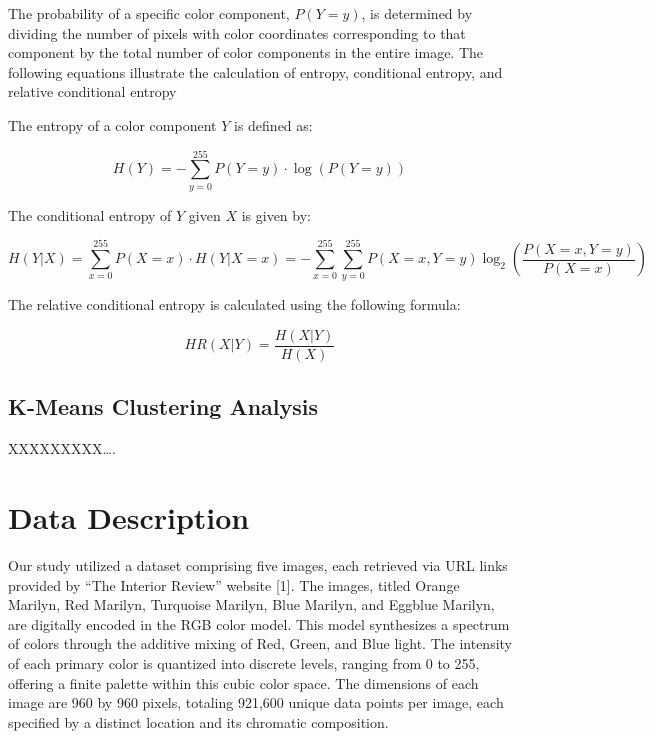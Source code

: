 \documentclass{article}
\begin{document}
The probability of a specific color component, \(P(Y=y)\), is determined
by dividing the number of pixels with color coordinates corresponding to
that component by the total number of color components in the entire
image. The following equations illustrate the calculation of entropy,
conditional entropy, and relative conditional entropy

The entropy of a color component \(Y\) is defined as:

\begin{equation}
    H(Y) = - \sum_{y=0}^{255} P(Y = y) \cdot \log(P(Y = y))
\end{equation}

The conditional entropy of \(Y\) given \(X\) is given by:

\begin{equation}
    H(Y|X) = \sum_{x=0}^{255} P(X = x) \cdot H(Y|X = x) = - \sum_{x=0}^{255} \sum_{y=0}^{255} P(X = x, Y = y) \log_2 \left(\frac{P(X = x, Y = y)}{P(X = x)}\right)
\end{equation}

The relative conditional entropy is calculated using the following
formula:

\begin{equation}
    HR(X|Y) = \frac{H(X|Y)}{H(X)}
\end{equation}

\hypertarget{k-means-clustering-analysis}{%
\subsection{K-Means Clustering
Analysis}\label{k-means-clustering-analysis}}

XXXXXXXXX\ldots.

\hypertarget{data-description}{%
\section{Data Description}\label{data-description}}

Our study utilized a dataset comprising five images, each retrieved via
URL links provided by ``The Interior Review'' website {[}1{]}. The
images, titled Orange Marilyn, Red Marilyn, Turquoise Marilyn, Blue
Marilyn, and Eggblue Marilyn, are digitally encoded in the RGB color
model. This model synthesizes a spectrum of colors through the additive
mixing of Red, Green, and Blue light. The intensity of each primary
color is quantized into discrete levels, ranging from 0 to 255, offering
a finite palette within this cubic color space. The dimensions of each
image are 960 by 960 pixels, totaling 921,600 unique data points per
image, each specified by a distinct location and its chromatic
composition.
\end{document}

